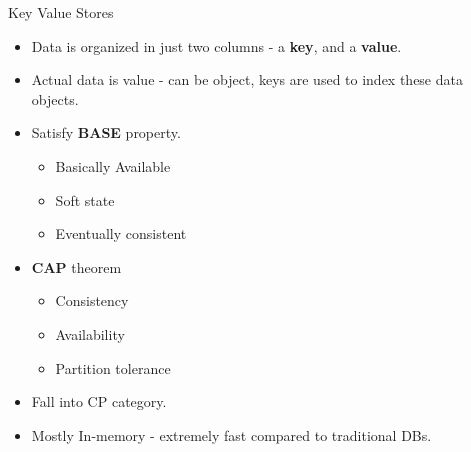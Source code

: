 \documentclass{beamer}
\begin{document}
\begin{frame}{Key Value Stores}
    \begin{itemize}
        \pause\item Data is organized in just two columns - a \textbf{key}, and a \textbf{value}.
        
        \pause\item Actual data is value - can be object, keys are used to index these data objects.
        
        \pause\item Satisfy \textbf{BASE} property.
            
            \begin{itemize}
                \pause\item Basically Available
                
                \pause\item Soft state
                
                \pause\item Eventually consistent
            \end{itemize}
        
        \pause\item \textbf{CAP} theorem
            \begin{itemize}
                
                \pause\item Consistency
                
                \pause\item Availability
                
                \pause\item Partition tolerance
            \end{itemize}
       
        \pause\item Fall into CP category.
        
        \pause\item Mostly In-memory - extremely fast compared to traditional DBs.
    \end{itemize}
\end{frame}
\end{document}
